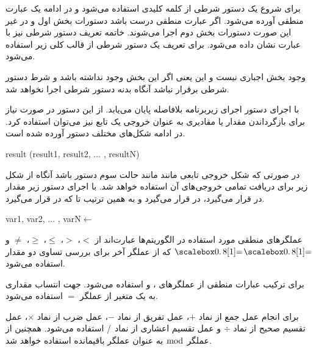 برای شروع یک دستور شرطی از کلمه کلیدی {} استفاده می‌شود و در ادامه یک عبارت منطقی آورده می‌شود. اگر عبارت منطقی درست باشد دستورات بخش اول و در غیر این صورت دستورات بخش دوم اجرا می‌شوند. خاتمه تعریف دستور شرطی نیز با  عبارت {} نشان داده می‌شود. برای تعریف یک دستور شرطی از قالب کلی زیر استفاده می‌شود.
\begin{latin}
\begin{algorithmic}[1]
	\State	{}
\Else
	\State	{}
\EndIf
\end{algorithmic}
\end{latin}
وجود بخش {} اجباری نیست و این یعنی اگر این بخش وجود نداشته باشد و شرط دستور شرطی برقرار نباشد آنگاه بدنه دستور شرطی اجرا نخواهد شد.

با اجرای دستور {} اجرای زیربرنامه بلافاصله پایان می‌یابد. از این دستور در صورت نیاز برای بازگرداندن مقدار یا مقادیری به عنوان خروجی یک تابع نیز می‌توان استفاده کرد. در ادامه شکل‌های مختلف دستور {} آورده شده است.
\begin{latin}
\begin{algorithmic}[1]
\State	\Return
\State	\Return result
\State	\Return (result1, result2, $\ldots$ , resultN)
\end{algorithmic}
\end{latin}
در صورتی که شکل خروجی تابعی مانند {} مانند حالت سوم دستور {} باشد آنگاه از شکل زیر برای دریافت تمامی خروجی‌های آن استفاده خواهد شد. با اجرای دستور زیر مقدار {} در {} قرار می‌گیرد، {} در {} قرار می‌گیرد و به همین ترتیب تا {} که در {} قرار می‌گیرد.
\begin{latin}
\begin{algorithmic}[1]
\State	var1, var2, $\ldots$ , varN$\gets$
\end{algorithmic}
\end{latin}
عملگرهای منطقی مورد استفاده در الگوریتم‌ها عبارت‌اند از {$<$}، {$>$}، {$\leq$}، {$\geq$}، {$\neq$} و {$\isequal$} که از عملگر آخر برای بررسی تساوی دو مقدار استفاده می‌شود.

برای ترکیب عبارات منطقی از عملگرهای {}، {} و {} استفاده می‌شود. جهت انتساب مقداری به یک متغیر از عملگر {$=$} استفاده می‌شود.

برای انجام عمل جمع از نماد {$+$}، عمل تفریق از نماد {$-$}، عمل ضرب از نماد {$\times$}، عمل تقسیم صحیح از نماد {$\div$} و عمل تقسیم اعشاری از نماد {$\operatorname{/}$} استفاده می‌شود. همچنین از عملگر {$\bmod$} به عنوان عملگر باقیمانده استفاده خواهد شد.

